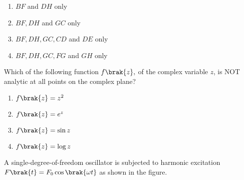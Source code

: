     \begin{enumerate}
        \item $BF$ and $DH$ only
        \item $BF,DH$ and $GC$ only
        \item $BF,DH,GC,CD$ and $DE$ only
        \item $BF,DH,GC,FG$ and $GH$ only
    \end{enumerate}
    \item Which of the following function $f\brak{z},$ of the complex variable $z$, is NOT analytic at all points on the complex plane?
    \begin{enumerate}
        \item $f\brak{z}=z^2$
        \item $f\brak{z}=e^z$
        \item $f\brak{z}=\sin{z}$
        \item $f\brak{z}=\log z$
    \end{enumerate}
    \item A single-degree-of-freedom oscillator is subjected to harmonic excitation $F\brak{t}=F_0\cos\brak{\omega t}$ as shown in the figure.\\
    
